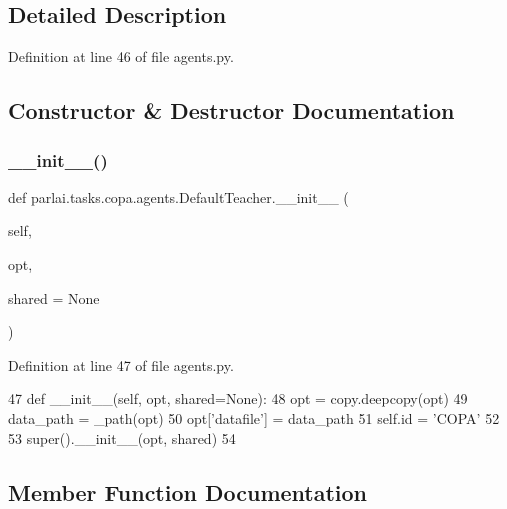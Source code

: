 \subsection{Detailed Description}


Definition at line 46 of file agents.\+py.



\subsection{Constructor \& Destructor Documentation}
\mbox{\label{classparlai_1_1tasks_1_1copa_1_1agents_1_1DefaultTeacher_af17bb5546ce20e08939af89fd069beeb}} 
\subsubsection{\texorpdfstring{\+\_\+\+\_\+init\+\_\+\+\_\+()}{\_\_init\_\_()}}
{\footnotesize\ttfamily def parlai.\+tasks.\+copa.\+agents.\+Default\+Teacher.\+\_\+\+\_\+init\+\_\+\+\_\+ (\begin{DoxyParamCaption}\item[{}]{self,  }\item[{}]{opt,  }\item[{}]{shared = {\ttfamily None} }\end{DoxyParamCaption})}



Definition at line 47 of file agents.\+py.


\begin{DoxyCode}
47     \textcolor{keyword}{def }\_\_init\_\_(self, opt, shared=None):
48         opt = copy.deepcopy(opt)
49         data\_path = \_path(opt)
50         opt[\textcolor{stringliteral}{'datafile'}] = data\_path
51         self.id = \textcolor{stringliteral}{'COPA'}
52 
53         super().\_\_init\_\_(opt, shared)
54 
\end{DoxyCode}


\subsection{Member Function Documentation}
\mbox{\label{classparlai_1_1tasks_1_1copa_1_1agents_1_1DefaultTeacher_ac4f70712171ace8882590d73247dcb5e}} 
